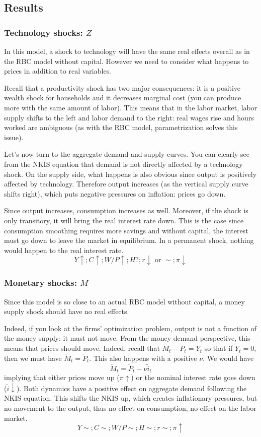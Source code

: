 \documentclass[12pt]{report}
\begin{document}
\subsection{Results}

\subsubsection{Technology shocks: $Z$}

In this model, a shock to technology will have the same real effects overall as in the RBC model without capital. However we need to consider what happens to prices in addition to real variables. 

Recall that a productivity shock has two major consequences: it is a positive wealth shock for households and it decreases marginal cost (you can produce more with the same amount of labor). This means that in the labor market, labor supply shifts to the left and labor demand to the right: real wages rise and hours worked are ambiguous (as with the RBC model, parametrization solves this issue).

Let's now turn to the aggregate demand and supply curves. You can clearly see from the NKIS equation that demand is not directly affected by a technology shock. On the supply side, what happens is also obvious since output is positively affected by technology. Therefore output increases (as the vertical supply curve shifts right), which puts negative pressures on inflation: prices go down.

Since output increases, consumption increases as well. Moreover, if the shock is only transitory, it will bring the real interest rate down. This is the case since consumption smoothing requires more savings and without capital, the interest must go down to leave the market in equilibrium. In a permanent shock, nothing would happen to the real interest rate.
$$ Y\uparrow ; C\uparrow ; W/P\uparrow ; H ? ; r\downarrow\text{ or } \sim ; \pi\downarrow$$ 

\subsubsection{Monetary shocks: $M$}

Since this model is so close to an actual RBC model without capital, a money supply shock should have no real effects. 

Indeed, if you look at the firms' optimization problem, output is not a function of the money supply: it must not move. From the money demand perspective, this means that prices should move. Indeed, recall that $\tilde M_t - \tilde P_t = \tilde Y_t$ so that if $\tilde Y_t = 0$, then we must have $\tilde M_t = \tilde P_t$. This also happens with a positive $\nu$. We would have $$\tilde M_t = \tilde P_t -\nu \tilde i_t $$ implying that either prices move up ($\pi\uparrow$) or the nominal interest rate goes down ($\tilde i\downarrow$). Both dynamics have a positive effect on aggregate demand following the NKIS equation. This shifts the NKIS up, which creates inflationary pressures, but no movement to the output, thus no effect on consumption, no effect on the labor market.
$$ Y\sim ; C\sim ; W/P\sim ; H\sim ; r\sim ; \pi\uparrow$$
\end{document}
